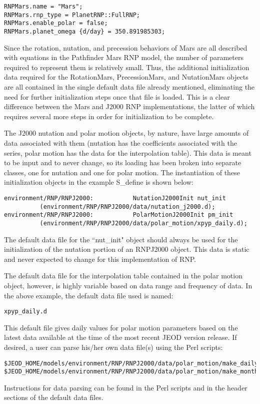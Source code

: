 \begin{verbatim}
RNPMars.name = "Mars";
RNPMars.rnp_type = PlanetRNP::FullRNP;
RNPMars.enable_polar = false;
RNPMars.planet_omega {d/day} = 350.891985303;
\end{verbatim}

Since the rotation, nutation, and precession behaviors of Mars are all
described with equations in the Pathfinder Mars RNP model, the
number of parameters required to represent them is relatively small. Thus, the
additional initialization data required for the RotationMars, PrecessionMars,
and NutationMars objects are all contained in the single default data file
already mentioned, eliminating the need for further initialization steps once
that file is loaded. This is a clear difference between the Mars and J2000 RNP
implementations, the latter of which requires several more steps in order for
initialization to be complete.

The J2000 nutation and polar motion objects, by nature, have large amounts of
data associated with them (nutation has the coefficients associated with the
series, polar motion has the data for the interpolation table). This data
is meant to be input and to never change, so its loading has been broken
into separate classes, one for nutation and one for polar motion. The
instantiation of these initialization objects in the example S\_define is shown
below:

\begin{verbatim}
environment/RNP/RNPJ2000:           NutationJ2000Init nut_init
          (environment/RNP/RNPJ2000/data/nutation_j2000.d);
environment/RNP/RNPJ2000:           PolarMotionJ2000Init pm_init
          (environment/RNP/RNPJ2000/data/polar_motion/xpyp_daily.d);
\end{verbatim}

The default data file for the ``nut\_init" object should always be used for
the initialization of the nutation portion of an RNPJ2000 object. This data
is static and never expected to change for this implementation of RNP.

The default data file for the interpolation table contained in the polar motion
object, however, is highly variable based on data range and frequency of data.
In the above example, the default data file used is named:

\begin{verbatim}
xpyp_daily.d
\end{verbatim}

This default file gives daily values for polar motion parameters based on
the latest data available at the time of the most recent JEOD version release.
If desired, a user can parse his/her own data file(s) using the Perl scripts:
\begin{verbatim}
$JEOD_HOME/models/environment/RNP/RNPJ2000/data/polar_motion/make_daily_file.pl
$JEOD_HOME/models/environment/RNP/RNPJ2000/data/polar_motion/make_monthly_file.pl
\end{verbatim}
Instructions for data parsing can be found in the Perl scripts
and in the header sections of the default data files.

